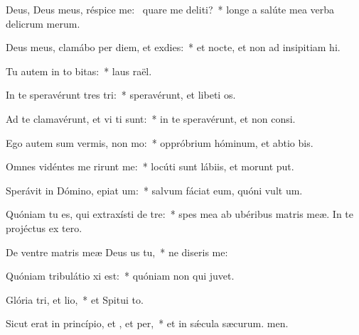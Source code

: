 \item Deus, Deus meus, réspice  me:~\pscross{} quare me deliti?~* longe a salúte mea verba delicrum merum.
\item Deus meus, clamábo per diem, et  exdies:~* et nocte, et non ad insipitiam hi.
\item Tu autem in to bitas:~* laus raël.
\item In te speravérunt tres tri:~* speravérunt, et libeti os.
\item Ad te clamavérunt, et vi ti sunt:~* in te speravérunt, et non  consi.
\item Ego autem sum vermis,  non mo:~* oppróbrium hóminum, et abtio bis.
\item Omnes vidéntes me rirunt me:~* locúti sunt lábiis, et morunt put.
\item Sperávit in Dómino, epiat um:~* salvum fáciat eum, quóni vult um.
\item Quóniam tu es, qui extraxísti  de tre:~* spes mea ab ubéribus matris meæ. In te projéctus  ex tero.
\item De ventre matris meæ Deus us  tu,~* ne diseris  me:
\item Quóniam tribulátio xi est:~* quóniam non  qui juvet.
\item Glória tri, et lio,~* et Spitui to.
\item Sicut erat in princípio, et , et per,~* et in sǽcula sæcurum. men.
